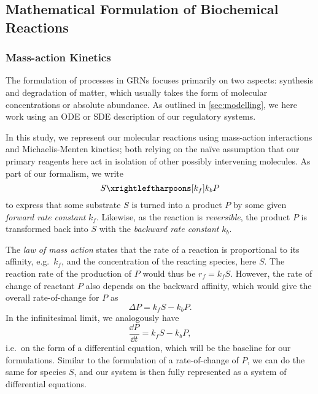 \subsection[Mathematical Formulation]{Mathematical Formulation of Biochemical
  Reactions}
\label{sec:mathematical_form}

\subsubsection[Mass-action Kinetics]{Mass-action Kinetics}
\label{sec:mass_action}
The formulation of processes in GRNs focuses primarily on two aspects: synthesis
and degradation of matter, which usually takes the form of molecular
concentrations or absolute abundance. As outlined in \cref{sec:modelling}, we
here work using an ODE or SDE description of  
our regulatory systems. 

In this study, we represent our molecular reactions using mass-action
interactions and Michaelis-Menten kinetics; both relying on the na\"ive
assumption that our primary reagents here act in isolation of other possibly
intervening molecules. As part of our formalism, we write
\begin{equation}
  S \xrightleftharpoons[k_{f}]{k_{b}} P
  \label{eq:simple_reac}
\end{equation}
to express that some substrate $S$ is turned into a product $P$ by some given
\textit{forward rate constant} $k_f$. Likewise, as the reaction is \textit{reversible}, the
product $P$ is transformed back into $S$ with the \textit{backward rate constant}
$k_b$. 

The \textit{law of mass action} states that the rate of a reaction
is proportional to its affinity, e.g.\ $k_f$, and the concentration of the
reacting species, here $S$. The reaction rate of the production of $P$ would thus be
$r_f = k_f S$. However, the rate of change of reactant $P$ also depends
on the backward affinity, which would give the overall rate-of-change for $P$ as
\begin{equation}
  \Delta P = k_f S - k_b P.
  \label{eq:mass_action_noninf}
\end{equation}
In the infinitesimal limit, we analogously have 
\begin{equation}
  \frac{\dd P}{\dd t} = k_f S - k_b P,
  \label{eq:mass_action_inf}
\end{equation}
i.e.\ on the form of a differential equation, which will be the baseline for our
formulations. Similar to the formulation of a rate-of-change of $P$, we can do the
same for species $S$, and our system is then fully represented as a system of
differential equations.

